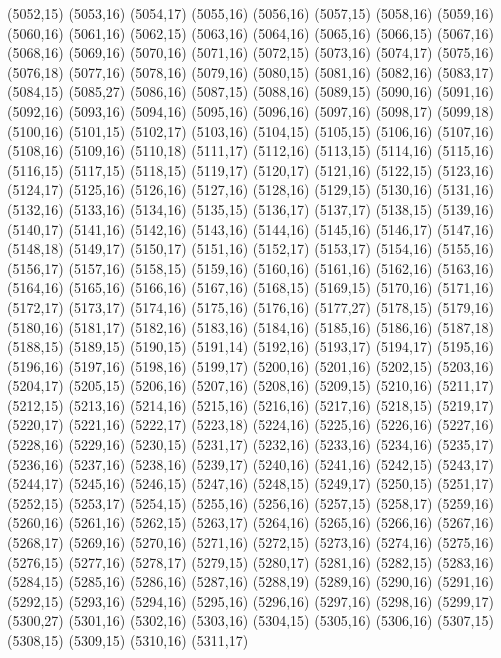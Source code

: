 (5052,15)
(5053,16)
(5054,17)
(5055,16)
(5056,16)
(5057,15)
(5058,16)
(5059,16)
(5060,16)
(5061,16)
(5062,15)
(5063,16)
(5064,16)
(5065,16)
(5066,15)
(5067,16)
(5068,16)
(5069,16)
(5070,16)
(5071,16)
(5072,15)
(5073,16)
(5074,17)
(5075,16)
(5076,18)
(5077,16)
(5078,16)
(5079,16)
(5080,15)
(5081,16)
(5082,16)
(5083,17)
(5084,15)
(5085,27)
(5086,16)
(5087,15)
(5088,16)
(5089,15)
(5090,16)
(5091,16)
(5092,16)
(5093,16)
(5094,16)
(5095,16)
(5096,16)
(5097,16)
(5098,17)
(5099,18)
(5100,16)
(5101,15)
(5102,17)
(5103,16)
(5104,15)
(5105,15)
(5106,16)
(5107,16)
(5108,16)
(5109,16)
(5110,18)
(5111,17)
(5112,16)
(5113,15)
(5114,16)
(5115,16)
(5116,15)
(5117,15)
(5118,15)
(5119,17)
(5120,17)
(5121,16)
(5122,15)
(5123,16)
(5124,17)
(5125,16)
(5126,16)
(5127,16)
(5128,16)
(5129,15)
(5130,16)
(5131,16)
(5132,16)
(5133,16)
(5134,16)
(5135,15)
(5136,17)
(5137,17)
(5138,15)
(5139,16)
(5140,17)
(5141,16)
(5142,16)
(5143,16)
(5144,16)
(5145,16)
(5146,17)
(5147,16)
(5148,18)
(5149,17)
(5150,17)
(5151,16)
(5152,17)
(5153,17)
(5154,16)
(5155,16)
(5156,17)
(5157,16)
(5158,15)
(5159,16)
(5160,16)
(5161,16)
(5162,16)
(5163,16)
(5164,16)
(5165,16)
(5166,16)
(5167,16)
(5168,15)
(5169,15)
(5170,16)
(5171,16)
(5172,17)
(5173,17)
(5174,16)
(5175,16)
(5176,16)
(5177,27)
(5178,15)
(5179,16)
(5180,16)
(5181,17)
(5182,16)
(5183,16)
(5184,16)
(5185,16)
(5186,16)
(5187,18)
(5188,15)
(5189,15)
(5190,15)
(5191,14)
(5192,16)
(5193,17)
(5194,17)
(5195,16)
(5196,16)
(5197,16)
(5198,16)
(5199,17)
(5200,16)
(5201,16)
(5202,15)
(5203,16)
(5204,17)
(5205,15)
(5206,16)
(5207,16)
(5208,16)
(5209,15)
(5210,16)
(5211,17)
(5212,15)
(5213,16)
(5214,16)
(5215,16)
(5216,16)
(5217,16)
(5218,15)
(5219,17)
(5220,17)
(5221,16)
(5222,17)
(5223,18)
(5224,16)
(5225,16)
(5226,16)
(5227,16)
(5228,16)
(5229,16)
(5230,15)
(5231,17)
(5232,16)
(5233,16)
(5234,16)
(5235,17)
(5236,16)
(5237,16)
(5238,16)
(5239,17)
(5240,16)
(5241,16)
(5242,15)
(5243,17)
(5244,17)
(5245,16)
(5246,15)
(5247,16)
(5248,15)
(5249,17)
(5250,15)
(5251,17)
(5252,15)
(5253,17)
(5254,15)
(5255,16)
(5256,16)
(5257,15)
(5258,17)
(5259,16)
(5260,16)
(5261,16)
(5262,15)
(5263,17)
(5264,16)
(5265,16)
(5266,16)
(5267,16)
(5268,17)
(5269,16)
(5270,16)
(5271,16)
(5272,15)
(5273,16)
(5274,16)
(5275,16)
(5276,15)
(5277,16)
(5278,17)
(5279,15)
(5280,17)
(5281,16)
(5282,15)
(5283,16)
(5284,15)
(5285,16)
(5286,16)
(5287,16)
(5288,19)
(5289,16)
(5290,16)
(5291,16)
(5292,15)
(5293,16)
(5294,16)
(5295,16)
(5296,16)
(5297,16)
(5298,16)
(5299,17)
(5300,27)
(5301,16)
(5302,16)
(5303,16)
(5304,15)
(5305,16)
(5306,16)
(5307,15)
(5308,15)
(5309,15)
(5310,16)
(5311,17)
